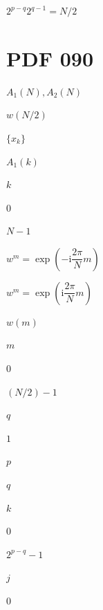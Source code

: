 \documentclass[UTF8,fontset=fandol,a4paper]{ctexart}
\begin{document}
\noindent $2^{p-q}2^{q-1}=N/2$\par

\section*{PDF 090}

\noindent $A_1(N),A_2(N)$\par

\noindent $w(N/2)$\par

\noindent $\{x_k\}$\par

\noindent $A_1(k)$\par

\noindent $k$\par

\noindent $0$\par

\noindent $N-1$\par

\noindent $w^m=\exp\left(-\mathrm i\dfrac{2\pi}{N}m\right)$\par

\noindent $w^m=\exp\left(\mathrm i\dfrac{2\pi}{N}m\right)$\par

\noindent $w(m)$\par

\noindent $m$\par

\noindent $0$\par

\noindent $(N/2)-1$\par

\noindent $q$\par

\noindent $1$\par

\noindent $p$\par

\noindent $q$\par

\noindent $k$\par

\noindent $0$\par

\noindent $2^{p-q}-1$\par

\noindent $j$\par

\noindent $0$\par
\end{document}
